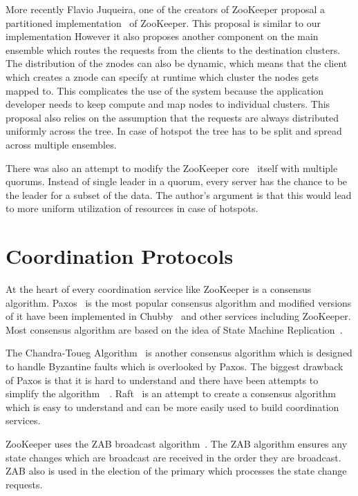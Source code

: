 More recently Flavio Juqueira, one of the creators of ZooKeeper proposal a partitioned implementation~\cite{junqueira2010partitioned} of ZooKeeper. This proposal is similar to our implementation However it also proposes another component on the main ensemble which routes the requests from the clients to the destination clusters. The distribution of the znodes can also be dynamic, which means that the client which creates a znode can specify at runtime which cluster the nodes gets mapped to. This complicates the use of the system because the application developer needs to keep compute and map nodes to individual clusters. This proposal also relies on the assumption that the requests are always distributed uniformly across the tree. In case of hotspot the tree has to be split and spread across multiple ensembles.

There was also an attempt to modify the ZooKeeper core~\cite{biligiri2014multiquorum} itself with multiple quorums. Instead of single leader in a quorum, every server has the chance to be the leader for a subset of the data. The author's argument is that this would lead to more uniform utilization of resources in case of hotspots. 

\section{Coordination Protocols}

At the heart of every coordination service like ZooKeeper is a consensus algorithm. Paxos~\cite{lamport2001paxos} is the most popular consensus algorithm and modified versions of it have been implemented in Chubby~\cite{burrows2006chubby} and other services including ZooKeeper. Most consensus algorithm are based on the idea of State Machine Replication~\cite{schneider1990implementing}. 

The Chandra-Toueg Algorithm~\cite{Chandra:1996:UFD:226643.226647} is another consensus algorithm which is designed to handle Byzantine faults which is overlooked by Paxos. The biggest drawback of Paxos is that it is hard to understand and there have been attempts to simplify the algorithm~\cite{chandra2007paxos}~\cite{lampson2001abcd}. Raft~\cite{ongaro2013search} is an attempt to create a consensus algorithm which is easy to understand and can be more easily used to build coordination services.

ZooKeeper uses the ZAB broadcast algorithm~\cite{junqueira2011zab}. The ZAB algorithm ensures any state changes which are broadcast are received in the order they are broadcast. ZAB also is used in the election of the primary which processes the state change requests.


